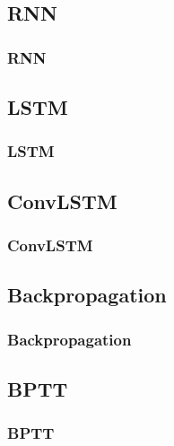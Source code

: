  \subsection{RNN}
  \begin{frame}
   \frametitle{RNN}
   
  \end{frame}
 
 \subsection{LSTM}
  \begin{frame}
   \frametitle{LSTM}
   
  \end{frame}
 
 \subsection{ConvLSTM}
  \begin{frame}
   \frametitle{ConvLSTM}
   
  \end{frame}
 
 \subsection{Backpropagation}
  \begin{frame}
   \frametitle{Backpropagation}
   
  \end{frame}

 \subsection{BPTT}
  \begin{frame}
   \frametitle{BPTT}
   
  \end{frame}  
